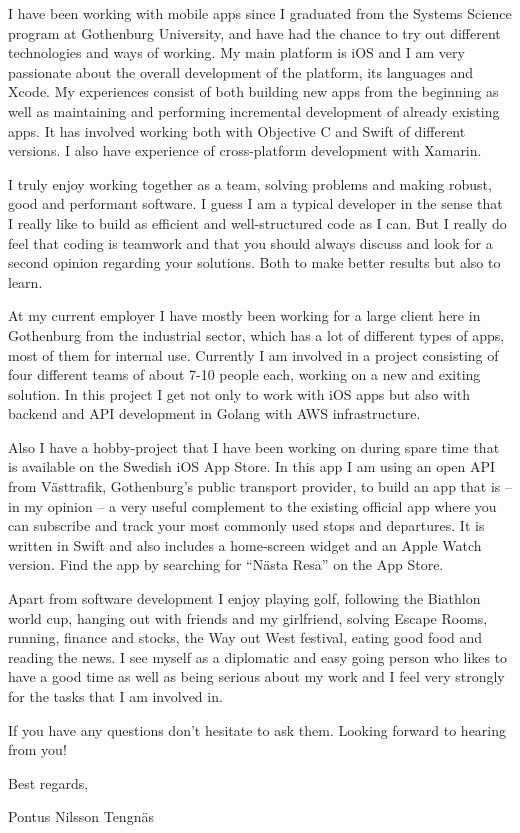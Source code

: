 

I have been working with mobile apps since I graduated from the Systems Science program at
Gothenburg University, and have had the chance to try out different technologies and ways 
of working. My main platform is iOS and I am very passionate about the overall development 
of the platform, its languages and Xcode. My experiences consist of both building new apps 
from the beginning as well as maintaining and performing incremental development of already
existing apps. It has involved working both with Objective C and Swift of different versions. 
I also have experience of cross-platform development with Xamarin.

I truly enjoy working together as a team, solving problems and making robust, good and
performant software. I guess I am a typical developer in the sense that I really like 
to build as efficient and well-structured code as I can. But I really do feel that coding 
is teamwork and that you should always discuss and look for a second opinion regarding your solutions. 
Both to make better results but also to learn.

At my current employer I have mostly been working for a large client here in Gothenburg from 
the industrial sector, which has a lot of different types of apps, most of them for internal use. 
Currently I am involved in a project consisting of four different teams of about 7-10 people each, 
working on a new and exiting solution. In this project I get not only to work with iOS apps 
but also with backend and API development in Golang with AWS infrastructure.

Also I have a hobby-project that I have been working on during spare time that is available 
on the Swedish iOS App Store. In this app I am using an open API from Västtrafik, Gothenburg’s public 
transport provider, to build an app that is – in my opinion – a very useful complement to the 
existing official app where you can subscribe and track your most commonly used stops and departures. 
It is written in Swift and also includes a home-screen widget and an Apple Watch version. Find 
the app by searching for “Nästa Resa” on the App Store.

Apart from software development I enjoy playing golf, following the Biathlon world cup, 
hanging out with friends and my girlfriend, solving Escape Rooms, running, finance and stocks, 
the Way out West festival, eating good food and reading the news. I see myself as a diplomatic 
and easy going person who likes to have a good time as well as being serious about my work and 
I feel very strongly for the tasks that I am involved in.

If you have any questions don’t hesitate to ask them. Looking forward to hearing from you!

Best regards,

Pontus Nilsson Tengnäs
